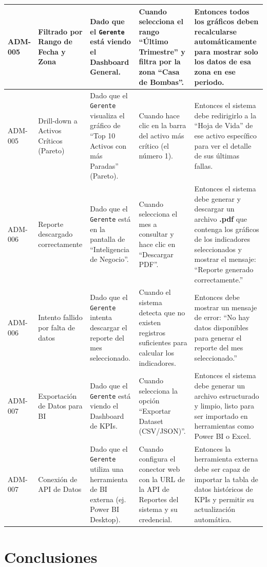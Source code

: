 \documentclass[12pt, a4paper]{article}
\begin{document}
\begin{longtable}{|p{1.8cm}|p{3cm}|p{3.5cm}|p{3.5cm}|p{3.5cm}|}
ADM-005 & Filtrado por Rango de Fecha y Zona & Dado que el \texttt{Gerente} está viendo el Dashboard General. & Cuando selecciona el rango ``Último Trimestre'' y filtra por la zona ``Casa de Bombas''. & Entonces todos los gráficos deben recalcularse automáticamente para mostrar solo los datos de esa zona en ese periodo. \\ \hline
ADM-005 & Drill-down a Activos Críticos (Pareto) & Dado que el \texttt{Gerente} visualiza el gráfico de ``Top 10 Activos con más Paradas'' (Pareto). & Cuando hace clic en la barra del activo más crítico (el número 1). & Entonces el sistema debe redirigirlo a la ``Hoja de Vida'' de ese activo específico para ver el detalle de sus últimas fallas. \\ \hline
ADM-006 & Reporte descargado correctamente & Dado que el \texttt{Gerente} está en la pantalla de “Inteligencia de Negocio”. & Cuando selecciona el mes a consultar y hace clic en “Descargar PDF”. & Entonces el sistema debe generar y descargar un archivo \textbf{.pdf} que contenga los gráficos de los indicadores seleccionados y mostrar el mensaje: “Reporte generado correctamente.” \\ \hline
ADM-006 & Intento fallido por falta de datos & Dado que el \texttt{Gerente} intenta descargar el reporte del mes seleccionado. & Cuando el sistema detecta que no existen registros suficientes para calcular los indicadores. & Entonces debe mostrar un mensaje de error: “No hay datos disponibles para generar el reporte del mes seleccionado.” \\ \hline
ADM-007 & Exportación de Datos para BI & Dado que el \texttt{Gerente} está viendo el Dashboard de KPIs. & Cuando selecciona la opción ``Exportar Dataset (CSV/JSON)''. & Entonces el sistema debe generar un archivo estructurado y limpio, listo para ser importado en herramientas como Power BI o Excel. \\ \hline
ADM-007 & Conexión de API de Datos & Dado que el \texttt{Gerente} utiliza una herramienta de BI externa (ej. Power BI Desktop). & Cuando configura el conector web con la URL de la API de Reportes del sistema y su credencial. & Entonces la herramienta externa debe ser capaz de importar la tabla de datos históricos de KPIs y permitir su actualización automática. \\ \hline
\end{longtable}

\section{Conclusiones}
\end{document}

